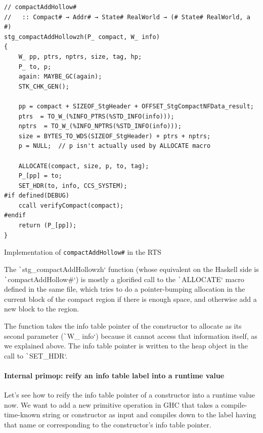 \documentclass[english]{jflart}
\begin{document}
\begin{table}[t]
\small
\begin{verbatim}
// compactAddHollow#
//   :: Compact# → Addr# → State# RealWorld → (# State# RealWorld, a #)
stg_compactAddHollowzh(P_ compact, W_ info)
{
    W_ pp, ptrs, nptrs, size, tag, hp;
    P_ to, p;
    again: MAYBE_GC(again);
    STK_CHK_GEN();

    pp = compact + SIZEOF_StgHeader + OFFSET_StgCompactNFData_result;
    ptrs  = TO_W_(%INFO_PTRS(%STD_INFO(info)));
    nptrs  = TO_W_(%INFO_NPTRS(%STD_INFO(info)));
    size = BYTES_TO_WDS(SIZEOF_StgHeader) + ptrs + nptrs;
    p = NULL;  // p isn't actually used by ALLOCATE macro

    ALLOCATE(compact, size, p, to, tag);
    P_[pp] = to;
    SET_HDR(to, info, CCS_SYSTEM);
#if defined(DEBUG)
    ccall verifyCompact(compact);
#endif
    return (P_[pp]);
}
\end{verbatim}
\caption{Implementation of \texttt{compactAddHollow\#} in the RTS}
\label{table:impl-compactAddHollow}
\end{table}

The \texttt`stg_compactAddHollowzh` function (whose equivalent on the Haskell side is \texttt`compactAddHollow#`) is mostly a glorified call to the \texttt`ALLOCATE` macro defined in the same file, which tries to do a pointer-bumping allocation in the current block of the compact region if there is enough space, and otherwise add a new block to the region.

The function takes the info table pointer of the constructor to allocate as its second parameter (\texttt`W_ info`) because it cannot access that information itself, as we explained above. The info table pointer is written to the heap object in the call to \texttt`SET_HDR`.

\paragraph{Internal primop: reify an info table label into a runtime value}

Let's see how to reify the info table pointer of a constructor into a runtime value now. We want to add a new primitive operation in GHC that takes a compile-time-known string or constructor as input and compiles down to the label having that name or corresponding to the constructor's info table pointer.
\end{document}
